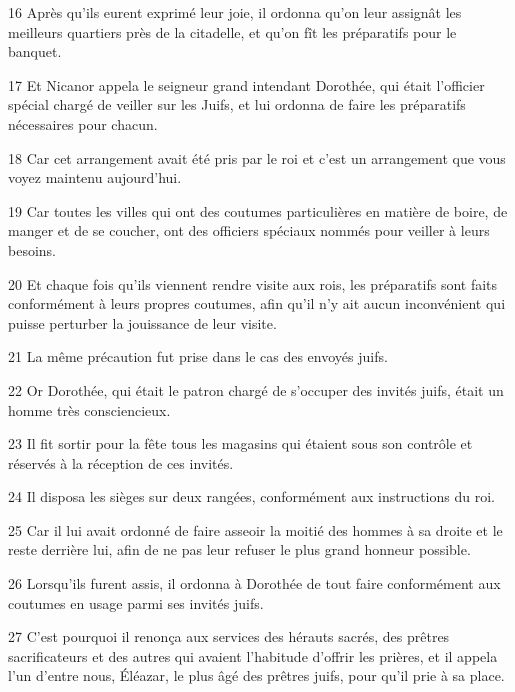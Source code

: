 \par 16 Après qu'ils eurent exprimé leur joie, il ordonna qu'on leur assignât les meilleurs quartiers près de la citadelle, et qu'on fît les préparatifs pour le banquet.

\par 17 Et Nicanor appela le seigneur grand intendant Dorothée, qui était l'officier spécial chargé de veiller sur les Juifs, et lui ordonna de faire les préparatifs nécessaires pour chacun.

\par 18 Car cet arrangement avait été pris par le roi et c'est un arrangement que vous voyez maintenu aujourd'hui.

\par 19 Car toutes les villes qui ont des coutumes particulières en matière de boire, de manger et de se coucher, ont des officiers spéciaux nommés pour veiller à leurs besoins.

\par 20 Et chaque fois qu'ils viennent rendre visite aux rois, les préparatifs sont faits conformément à leurs propres coutumes, afin qu'il n'y ait aucun inconvénient qui puisse perturber la jouissance de leur visite.

\par 21 La même précaution fut prise dans le cas des envoyés juifs.

\par 22 Or Dorothée, qui était le patron chargé de s'occuper des invités juifs, était un homme très consciencieux.

\par 23 Il fit sortir pour la fête tous les magasins qui étaient sous son contrôle et réservés à la réception de ces invités.

\par 24 Il disposa les sièges sur deux rangées, conformément aux instructions du roi.

\par 25 Car il lui avait ordonné de faire asseoir la moitié des hommes à sa droite et le reste derrière lui, afin de ne pas leur refuser le plus grand honneur possible.

\par 26 Lorsqu'ils furent assis, il ordonna à Dorothée de tout faire conformément aux coutumes en usage parmi ses invités juifs.

\par 27 C'est pourquoi il renonça aux services des hérauts sacrés, des prêtres sacrificateurs et des autres qui avaient l'habitude d'offrir les prières, et il appela l'un d'entre nous, Éléazar, le plus âgé des prêtres juifs, pour qu'il prie à sa place.


